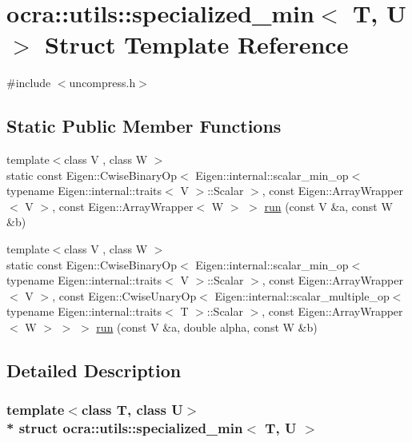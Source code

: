 \hypertarget{structocra_1_1utils_1_1specialized__min}{}\section{ocra\+:\+:utils\+:\+:specialized\+\_\+min$<$ T, U $>$ Struct Template Reference}
\label{structocra_1_1utils_1_1specialized__min}


{\ttfamily \#include $<$uncompress.\+h$>$}

\subsection*{Static Public Member Functions}
\begin{DoxyCompactItemize}
\item 
{\footnotesize template$<$class V , class W $>$ }\\static const Eigen\+::\+Cwise\+Binary\+Op$<$ Eigen\+::internal\+::scalar\+\_\+min\+\_\+op$<$ typename Eigen\+::internal\+::traits$<$ V $>$\+::Scalar $>$, const Eigen\+::\+Array\+Wrapper$<$ V $>$, const Eigen\+::\+Array\+Wrapper$<$ W $>$ $>$ \hyperlink{structocra_1_1utils_1_1specialized__min_a8ccdfb97b3ade7ea2043fd608c8bade5}{run} (const V \&a, const W \&b)
\item 
{\footnotesize template$<$class V , class W $>$ }\\static const Eigen\+::\+Cwise\+Binary\+Op$<$ Eigen\+::internal\+::scalar\+\_\+min\+\_\+op$<$ typename Eigen\+::internal\+::traits$<$ V $>$\+::Scalar $>$, const Eigen\+::\+Array\+Wrapper$<$ V $>$, const Eigen\+::\+Cwise\+Unary\+Op$<$ Eigen\+::internal\+::scalar\+\_\+multiple\+\_\+op$<$ typename Eigen\+::internal\+::traits$<$ T $>$\+::Scalar $>$, const Eigen\+::\+Array\+Wrapper$<$ W $>$ $>$ $>$ \hyperlink{structocra_1_1utils_1_1specialized__min_aeb9da860eb661e340840d81bc5b5202a}{run} (const V \&a, double alpha, const W \&b)
\end{DoxyCompactItemize}


\subsection{Detailed Description}
\subsubsection*{template$<$class T, class U$>$\\*
struct ocra\+::utils\+::specialized\+\_\+min$<$ T, U $>$}



